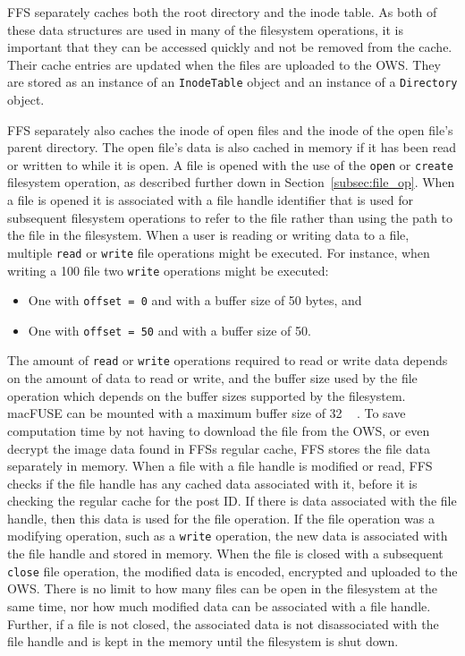 \gls{FFS} separately caches both the root directory and the inode table. As both of these data structures are used in many of the filesystem operations, it is important that they can be accessed quickly and not be removed from the cache. Their cache entries are updated when the files are uploaded to the \gls{OWS}. They are stored as an instance of an \texttt{InodeTable} object and an instance of a \texttt{Directory} object.

\gls{FFS} separately also caches the inode of open files and the inode of the open file's parent directory. The open file's data is also cached in memory if it has been read or written to while it is open. A file is opened with the use of the \texttt{open} or \texttt{create} filesystem operation, as described further down in Section~\ref{subsec:file_op}. When a file is opened it is associated with a file handle identifier that is used for subsequent filesystem operations to refer to the file rather than using the path to the file in the filesystem. When a user is reading or writing data to a file, multiple \texttt{read} or \texttt{write} file operations might be executed. For instance, when writing a \SI{100}{\byte} file two \texttt{write} operations might be executed:
\begin{itemize}
	\item One with \texttt{offset = 0} and with a buffer size of \SI{50}{\byte} bytes, and
	\item One with \texttt{offset = 50} and with a buffer size of \SI{50}{\byte}.
\end{itemize}
The amount of \texttt{read} or \texttt{write} operations required to read or write data depends on the amount of data to read or write, and the buffer size used by the file operation which depends on the buffer sizes supported by the filesystem. macFUSE can be mounted with a maximum buffer size of \SI{32}{\mega\byte}\,\cite{fleischerMountOptionsOsxfuse2020}. To save computation time by not having to download the file from the \gls{OWS}, or even decrypt the image data found in \gls{FFS}s regular cache, \gls{FFS} stores the file data separately in memory. When a file with a file handle is modified or read, \gls{FFS} checks if the file handle has any cached data associated with it, before it is checking the regular cache for the post ID. If there is data associated with the file handle, then this data is used for the file operation. If the file operation was a modifying operation, such as a \texttt{write} operation, the new data is associated with the file handle and stored in memory. When the file is closed with a subsequent \texttt{close} file operation, the modified data is encoded, encrypted and uploaded to the \gls{OWS}. There is no limit to how many files can be open in the filesystem at the same time, nor how much modified data can be associated with a file handle. Further, if a file is not closed, the associated data is not disassociated with the file handle and is kept in the memory until the filesystem is shut down.

